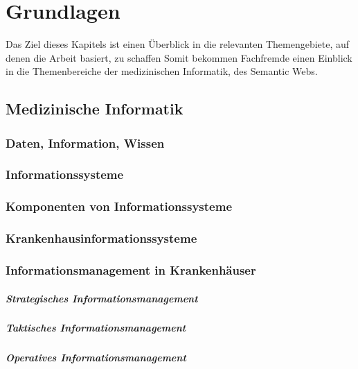 \chapter{Grundlagen}\label{ch:preliminaries}

Das Ziel dieses Kapitels ist einen Überblick in die relevanten Themengebiete, auf denen die Arbeit basiert, zu schaffen
Somit bekommen Fachfremde einen Einblick in die Themenbereiche der medizinischen Informatik, des Semantic Webs.

\section{Medizinische Informatik}\label{sec:mi}

\subsection{Daten, Information, Wissen}

\subsection{Informationssysteme}

\subsection{Komponenten von Informationssysteme}

\subsection{Krankenhausinformationssysteme}

\subsection{Informationsmanagement in Krankenhäuser}

\paragraph{Strategisches Informationsmanagement}

\paragraph{Taktisches Informationsmanagement}

\paragraph{Operatives Informationsmanagement}

